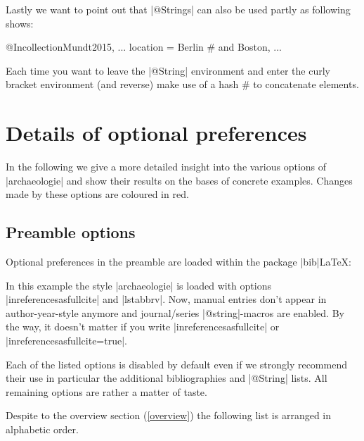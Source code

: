 \documentclass[a4paper,
10pt,
greek,
french,
spanish,
italian,
ngerman,
english,
]{ltxdoc}
\begin{document}
Lastly we want to point out that |@Strings| can also be used partly as following shows:

\begin{code}
@Incollection{Mundt2015,
  ...
  location     = Berlin #{ and Boston}, %
  ...
}
\end{code}

Each time you want to leave the |@String| environment and enter the curly bracket environment (and reverse) make use of a hash \# to concatenate elements.  

\section{Details of optional preferences}\label{options-description}
In the following  we give a more detailed insight into the various options of |archaeologie| 
and show their results on the bases of concrete examples.
Changes made by these options are {\color{red}coloured in red}.

\subsection{Preamble options}\label{options-preamble}
Optional preferences in the preamble are loaded within the package |bib|\LaTeX:
\begin{code}
\usepackage[%
    backend=biber,  %
    style=archaeologie,   %
    inreferencesasfullcite=true,    %
    lstabbrv              %
    ]{biblatex}
\end{code}
In this example the style |archaeologie| is loaded with options |inreferencesasfullcite| and |lstabbrv|. 
Now, manual entries don't appear in author-year-style anymore and journal/series |@string|-macros are enabled.
By the way, it doesn't matter if you write |inreferencesasfullcite| or |inreferencesasfullcite=true|.

Each of the listed options is disabled by default even if we strongly recommend their use in particular the additional bibliographies and |@String| lists. 
All remaining options are rather a matter of taste.

Despite to the overview section (\cref{overview}) the following list is arranged in alphabetic order.
\end{document}

